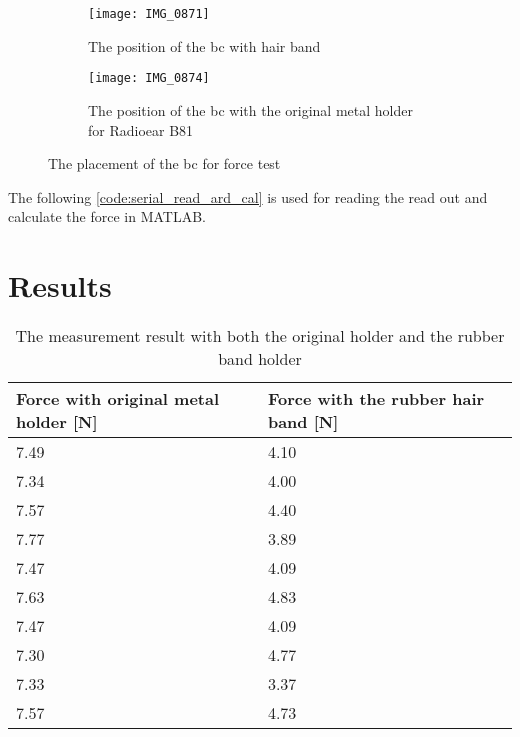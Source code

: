 \begin{figure}[H]
\centering
\begin{subfigure}[htbp]{0.33\textwidth}
		\texttt{[image: IMG\_0871]}
		\caption{The position of the \gls{bc} with hair band}
		\label{fig:bc_hair_band}
\end{subfigure}\vspace{10pt}
\begin{subfigure}[htbp]{0.60\textwidth}
		\texttt{[image: IMG\_0874]}
		\caption{The position of the \gls{bc} with the original metal holder for Radioear B81}
		\label{fig:bc_metal_holder}
\end{subfigure} \hspace{10pt}
\caption{The placement of the \gls{bc} for force test}
\label{fig:bc_holder}
\end{figure}


The following \autoref{code:serial_read_ard_cal} is used for reading the read out and calculate the force in MATLAB.



\section*{Results}


\begin{table}[H]
\centering
\caption{The measurement result with both the original holder and the rubber band holder}
\label{apend:weight_result}
\begin{tabular}{l|l}
Force with original metal holder [\si{\newton}] & Force with the rubber hair band [\si{\newton}] \\ \hline
7.49                                           & 4.10                                          \\
7.34                                           & 4.00                                          \\
7.57                                           & 4.40                                          \\
7.77                                           & 3.89                                          \\
7.47                                           & 4.09                                          \\
7.63                                           & 4.83                                          \\
7.47                                           & 4.09                                          \\
7.30                                           & 4.77                                          \\
7.33                                           & 3.37                                          \\
7.57                                           & 4.73                                         
\end{tabular}
\end{table}


